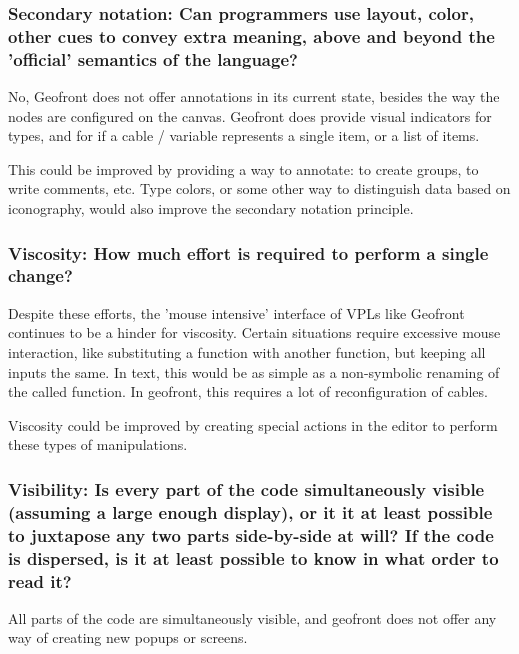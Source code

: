 \subsubsection*{Secondary notation: Can programmers use layout, color, other cues to convey extra meaning, above and beyond the 'official' semantics of the language?}

No, Geofront does not offer annotations in its current state, besides the way the nodes are configured on the canvas.  
Geofront does provide visual indicators for types, and for if a cable / variable represents a single item, or a list of items.

This could be improved by providing a way to annotate: to create groups, to write comments, etc. 
Type colors, or some other way to distinguish data based on iconography, would also improve the secondary notation principle.

\subsubsection*{Viscosity: How much effort is required to perform a single change?}

Despite these efforts, the 'mouse intensive' interface of VPLs like Geofront continues to be a hinder for viscosity.
Certain situations require excessive mouse interaction, like substituting a function with another function, but keeping all inputs the same.
In text, this would be as simple as a non-symbolic renaming of the called function.
In geofront, this requires a lot of reconfiguration of cables. 

Viscosity could be improved by creating special actions in the editor to perform these types of manipulations.  

\subsubsection*{Visibility: Is every part of the code simultaneously visible (assuming a large enough display), or it it at least possible to juxtapose any two parts side-by-side at will? If the code is dispersed, is it at least possible to know in what order to read it?}

All parts of the code are simultaneously visible, and geofront does not offer any way of creating new popups or screens.

